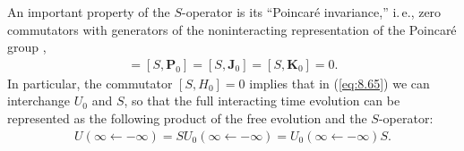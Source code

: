 \documentclass[]{stefan1}
\begin{document}
An important property of the $ S $-operator is its ``Poincar\'{e}
invariance,'' i.\,e., zero commutators with generators of the
noninteracting representation of the Poincar\'{e} group
\cite{book,Kazes},
%
\begin{align}
[S,H_{0}] = [S, \boldsymbol{P}_{0}] = [S,
\boldsymbol{J}_{0}] = [S, \boldsymbol{K}_{0}] = 0.
\label{eq:S-rel-inv}
\end{align}
In particular, the commutator $ [S, H_{0}] = 0 $ implies that in
(\ref{eq:8.65}) we can interchange $ U_{0} $ and $ S $, so that the full
interacting time evolution can be represented as the following product
of the free evolution and the $ S $-operator:
%
\begin{align}
U(\infty \gets -\infty ) = S U_{0}(\infty \gets -\infty ) =
U_{0}( \infty \gets -\infty ) S. \label{eq:8.65a}
\end{align}

\end{document}
